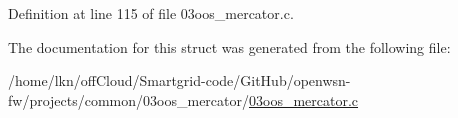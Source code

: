 Definition at line 115 of file 03oos\+\_\+mercator.\+c.



The documentation for this struct was generated from the following file\+:\begin{DoxyCompactItemize}
\item 
/home/lkn/off\+Cloud/\+Smartgrid-\/code/\+Git\+Hub/openwsn-\/fw/projects/common/03oos\+\_\+mercator/\hyperlink{03oos__mercator_8c}{03oos\+\_\+mercator.\+c}\end{DoxyCompactItemize}
